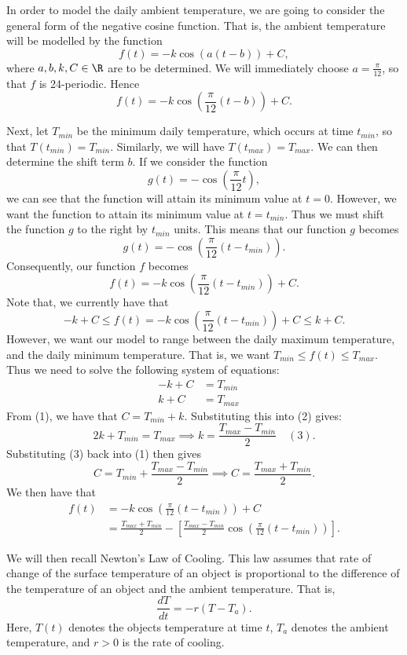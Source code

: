 \documentclass{article}
\begin{document}
In order to model the daily ambient temperature, we are going to consider the general form of the negative cosine function. That is, the ambient temperature will be modelled by the function \[f(t)=-k\cos(a(t-b))+C,\] where \(a,b,k,C\in\R\) are to be determined. We will immediately choose \(a=\frac{\pi}{12}\), so that \(f\) is 24-periodic. Hence
\[f(t)=-k\cos(\frac{\pi}{12}(t-b))+C.\]


Next, let \(T_{min}\) be the minimum daily temperature, which occurs at time \(t_{min}\), so that \(T(t_{min})=T_{min}\). Similarly, we will have \(T(t_{max}) = T_{max}\). We can then determine the shift term \(b\). If we consider the function \[g(t)=-\cos(\frac{\pi}{12}t),\] we can see that the function will attain its minimum value at \(t=0\). However, we want the function to attain its minimum value at \(t=t_{min}\). Thus we must shift the function \(g\) to the right by \(t_{min}\) units. This means that our function \(g\) becomes \[g(t)=-\cos(\frac{\pi}{12}(t-t_{min})).\]
Consequently, our function \(f\) becomes \[f(t)=-k\cos(\frac{\pi}{12}(t-t_{min}))+C.\]
Note that, we currently have that \[-k+C\leq f(t)=-k\cos(\frac{\pi}{12}(t-t_{min}))+C \leq k+C.\]
However, we want our model to range between the daily maximum temperature, and the daily minimum temperature. That is, we want \(T_{min}\leq f(t)\leq T_{max}\). Thus we need to solve the following system of equations:
\begin{align}
    -k+C &= T_{min}\quad\\
    k+C &= T_{max} \quad
\end{align}
From (1), we have that \(C=T_{min}+k\). Substituting this into (2) gives:
\[2k+T_{min} = T_{max} \implies k=\frac{T_{max}-T_{min}}{2} \quad (3). \]
Substituting (3) back into (1) then gives \[C=T_{min}+\frac{T_{max}-T_{min}}{2} \implies C=\frac{T_{max}+T_{min}}{2}.\]
We then have that 
\begin{align*}
f(t)&=-k\cos(\frac{\pi}{12}(t-t_{min}))+C\\
&=\frac{T_{max}+T_{min}}{2} - \left[\frac{T_{max}-T_{min}}{2}\cos(\frac{\pi}{12}(t-t_{min}))\right].
\end{align*}

We will then recall Newton's Law of Cooling. This law assumes that rate of change of the surface temperature of an object is proportional to the difference of the temperature of an object and the ambient temperature. That is, \[\frac{dT}{dt}=-r(T-T_a).\]
Here, \(T(t)\) denotes the objects temperature at time \(t\), \(T_a\) denotes the ambient temperature, and \(r>0\) is the rate of cooling. 
\end{document}
